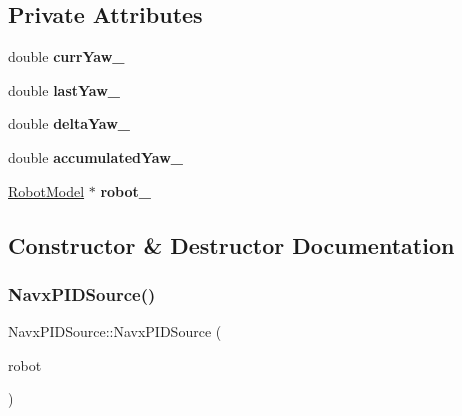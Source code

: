 \subsection*{Private Attributes}
\begin{DoxyCompactItemize}
\item 
\mbox{\label{class_navx_p_i_d_source_a4e7fd0ab07e2a452de4e6dee8046a1e4}} 
double {\bfseries curr\+Yaw\+\_\+}
\item 
\mbox{\label{class_navx_p_i_d_source_ad23e187c9090d314887e3190d9f9f7a7}} 
double {\bfseries last\+Yaw\+\_\+}
\item 
\mbox{\label{class_navx_p_i_d_source_a44ed45bd794ad3011e951a47f1a2dbee}} 
double {\bfseries delta\+Yaw\+\_\+}
\item 
\mbox{\label{class_navx_p_i_d_source_a034f1d606b899986012a67863cab39a3}} 
double {\bfseries accumulated\+Yaw\+\_\+}
\item 
\mbox{\label{class_navx_p_i_d_source_aaf8ac0b9fdad1ee64788ea7b50acc388}} 
\hyperlink{class_robot_model}{Robot\+Model} $\ast$ {\bfseries robot\+\_\+}
\end{DoxyCompactItemize}


\subsection{Constructor \& Destructor Documentation}
\mbox{\label{class_navx_p_i_d_source_a6d8910e49ac582970632e8ad20e9bc4b}} 
\subsubsection{\texorpdfstring{Navx\+P\+I\+D\+Source()}{NavxPIDSource()}}
{\footnotesize\ttfamily Navx\+P\+I\+D\+Source\+::\+Navx\+P\+I\+D\+Source (\begin{DoxyParamCaption}\item[{\hyperlink{class_robot_model}{Robot\+Model} $\ast$}]{robot }\end{DoxyParamCaption})}

